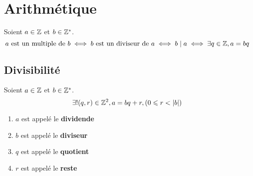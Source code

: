 \chapter{Arithmétique}
\def\arraystretch{1}

\begin{definition}
    Soient $a \in \mathbb{Z}$ et $b \in \mathbb{Z}^*$.
    \[ a \text{ est un multiple de } b \iff b \text{ est un diviseur de } a \iff b \mid a \iff \exists q \in \mathbb{Z}, a = bq \]
\end{definition}

\section{Divisibilité}

\begin{theorem}
    Soient $a \in \mathbb{Z}$ et $b \in \mathbb{Z}^*$.
    \[ \exists ! (q, r) \in \mathbb{Z}^2, a = bq + r, (0 \leqslant r < \abs{b}) \]
    \begin{enumerate}
    	\item $a$ est appelé le \textbf{dividende}
        \item $b$ est appelé le \textbf{diviseur}
        \item $q$ est appelé le \textbf{quotient}
        \item $r$ est appelé le \textbf{reste}
    \end{enumerate}
\end{theorem}

